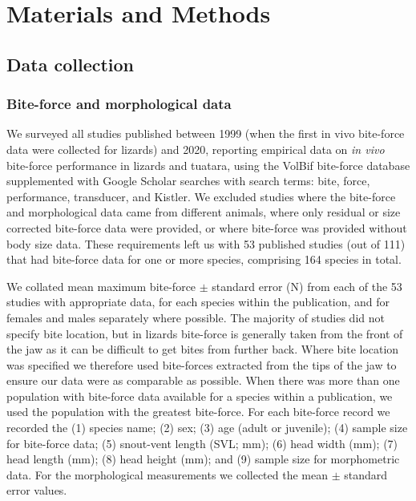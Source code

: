\documentclass[a4paper, 12pt]{article}
\begin{document}

\section{Materials and Methods}

\subsection{Data collection}

\subsubsection{Bite-force and morphological data}
We surveyed all studies published between 1999 (when the first in vivo bite-force data were collected for lizards) and 2020, reporting empirical data on \textit{in vivo} bite-force performance in lizards and tuatara, using the VolBif bite-force database \cite{lappin2014reliable} supplemented with Google Scholar searches with search terms: bite, force, performance, transducer, and Kistler. 
We excluded studies where the bite-force and morphological data came from different animals, where only residual or size corrected bite-force data were provided, or where bite-force was provided without body size data. 
These requirements left us with 53 published studies (out of 111) that had bite-force data for one or more species, comprising 164 species in total. 

We collated mean maximum bite-force $\pm$ standard error (N) from each of the 53 studies with appropriate data, for each species within the publication, and for females and males separately where possible. 
The majority of studies did not specify bite location, but in lizards bite-force is generally taken from the front of the jaw as it can be difficult to get bites from further back\cite{lappin2014reliable}. 
Where bite location was specified we therefore used bite-forces extracted from the tips of the jaw to ensure our data were as comparable as possible.
When there was more than one population with bite-force data available for a species within a publication, we used the population with the greatest bite-force. 
For each bite-force record we recorded the (1) species name; (2) sex; (3) age (adult or juvenile); (4) sample size for bite-force data; (5) snout-vent length (SVL; mm); (6) head width (mm); (7) head length (mm); (8) head height (mm); and (9) sample size for morphometric data. 
For the morphological measurements we collected the mean $\pm$ standard error values. 
\end{document}
